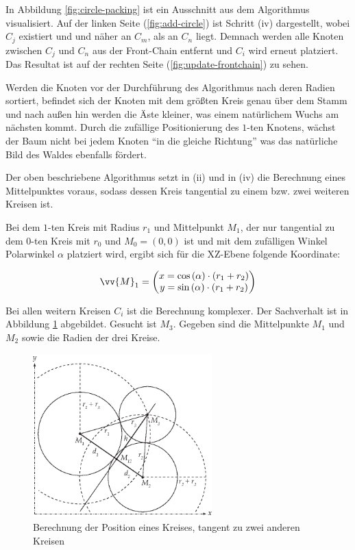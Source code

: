 In Abbildung \ref{fig:circle-packing} ist ein Ausschnitt aus dem Algorithmus visualisiert. Auf der linken Seite (\ref{fig:add-circle}) ist Schritt (iv) dargestellt, wobei $C_j$ existiert und und näher an $C_m$, als an $C_n$ liegt. Demnach werden alle Knoten zwischen $C_j$ und $C_n$ aus der Front-Chain entfernt und $C_i$ wird erneut platziert. Das Resultat ist auf der rechten Seite (\ref{fig:update-frontchain}) zu sehen.

Werden die Knoten vor der Durchführung des Algorithmus nach deren Radien sortiert, befindet sich der Knoten mit dem größten Kreis genau über dem Stamm und nach außen hin werden die Äste kleiner, was einem natürlichem Wuchs am nächsten kommt. Durch die zufällige Positionierung des $1$-ten Knotens, wächst der Baum nicht bei jedem Knoten "`in die gleiche Richtung"' was das natürliche Bild des Waldes ebenfalls fördert.

Der oben beschriebene Algorithmus setzt in (ii) und in (iv) die Berechnung eines Mittelpunktes voraus, sodass dessen Kreis tangential zu einem bzw. zwei weiteren Kreisen ist.

Bei dem $1$-ten Kreis mit Radius $r_1$ und Mittelpunkt $M_1$, der nur tangential zu dem $0$-ten Kreis mit $r_0$ und $M_0 = (0,0)$ ist und mit dem zufälligen Winkel Polarwinkel $\alpha$ platziert wird, ergibt sich für die XZ-Ebene folgende Koordinate:

\begin{equation}
  \vv{M}_1 = 
  \begin{pmatrix}
    x = \cos\left(\alpha\right) \cdot \left(r_1 + r_2\right)\\
    y = \sin\left(\alpha\right) \cdot \left(r_1 + r_2\right)\\
  \end{pmatrix}
\end{equation}

Bei allen weitern Kreisen $C_i$ ist die Berechnung komplexer. Der Sachverhalt ist in Abbildung \ref{fig:tangent-circle} abgebildet. Gesucht ist $M_3$. Gegeben sind die Mittelpunkte $M_1$ und $M_2$ sowie die Radien der drei Kreise.

\begin{figure}[htb]
  \includegraphics[width=261.593px]{figures/tangent-circle}
  \caption{Berechnung der Position eines Kreises, tangent zu zwei anderen Kreisen}
  \label{fig:tangent-circle}
\end{figure}

